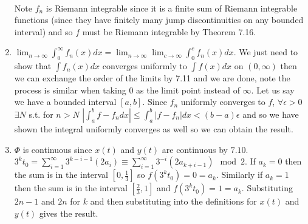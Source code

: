 \documentclass{article}
\begin{document}
\begin{enumerate}
\\ Note $f_n$ is Riemann integrable since it is a finite sum of Riemann integrable functions (since they have finitely many jump discontinuities on any bounded interval) and so $f$ must be Riemann integrable by Theorem 7.16.\\
\setcounter{enumi}{11}
\item $\displaystyle\lim_{n\rightarrow\infty} \int_{0}^{\infty} f_n(x) dx = \lim_{n\rightarrow\infty} \lim_{c\rightarrow\infty} \int_{0}^{c} f_n(x) dx$. We just need to show that $\int f_n (x) dx$ converges uniformly to $\int f(x) dx$ on $(0, \infty)$ then we can exchange the order of the limits by 7.11 and we are done, note the process is similar when taking $0$ as the limit point instead of $\infty$. Let us say we have a bounded interval $[a, b]$. Since $f_n$ uniformly converges to $f$, $\forall\epsilon>0$ $\exists N$ s.t. for $n>N$ $\displaystyle\left| \int_{a}^{b} f-f_n dx \right| \leq  \int_{a}^{b} |f-f_n| dx < (b-a) \epsilon$ and so we have shown the integral uniformly converges as well so we can obtain the result.\\
\setcounter{enumi}{13}
\item $\Phi$ is continuous since $x(t)$ and $y(t)$ are continuous by $7.10$. 
\\ $3^k t_0 = \displaystyle\sum_{i=1}^{\infty} 3^{k-i-1} (2a_i)\equiv \sum_{i=1}^{\infty} 3^{-i}(2a_{k+i-1}) \mod 2$. If $a_k = 0$ then the sum is in the interval $[0, \frac{1}{3}]$ so $f(3^k t_0) =0=a_k$. Similarly if $a_k = 1$ then the sum is in the interval $[\frac{2}{3}, 1]$ and $f(3^k t_0) = 1 = a_k$. Substituting $2n-1$ and $2n$ for $k$ and then substituting into the definitions for $x(t)$ and $y(t)$ gives the result.
\end{enumerate} 
\end{document}
